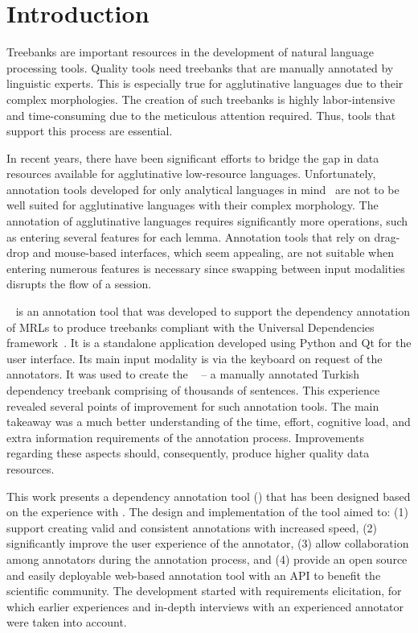 \section{Introduction}
\label{sec:introduction}

Treebanks are important resources in the development of natural language processing tools.
Quality tools need treebanks that are manually annotated by linguistic experts.
This is especially true for agglutinative languages due to their complex morphologies.
The creation of such treebanks is highly labor-intensive and time-consuming due to the meticulous attention required.
Thus, tools that support this process are essential.

In recent years, there have been significant efforts to bridge the gap in data resources available for agglutinative low-resource languages.
Unfortunately, annotation tools developed for only analytical languages in mind~\cite{UD-tools} are not to be well suited for agglutinative languages with their complex morphology.
The annotation of agglutinative languages requires significantly more operations, such as entering several features for each lemma.
Annotation tools that rely on drag-drop and mouse-based interfaces, which seem appealing, are not suitable when entering numerous features is necessary since swapping between input modalities disrupts the flow of a session.

\boatvone~\cite{turk2021resources} is an annotation tool that was developed to support the dependency annotation of MRLs to produce treebanks compliant with the Universal Dependencies framework~\cite{UD}.
It is a standalone application developed using Python and Qt for the user interface.
Its main input modality is via the keyboard on request of the annotators.
It was used to create the \bountreebank~\cite{turk-etal-2019-turkish,turk2021resources,UD-Boun-Treebank} -- a manually annotated Turkish dependency treebank comprising of thousands of sentences.
This experience revealed several points of improvement for such annotation tools.
The main takeaway was a much better understanding of the time, effort, cognitive load, and extra information requirements of the annotation process.
Improvements regarding these aspects should, consequently, produce higher quality data resources.

This work presents a dependency annotation tool (\boatvtwo) that has been designed based on the experience with \boatvone.
The design and implementation of the tool aimed to: (1) support creating valid and consistent annotations with increased speed, (2) significantly improve the user experience of the annotator, (3) allow collaboration among annotators during the annotation process, and (4) provide an open source and easily deployable web-based annotation tool with an API to benefit the scientific community.
The development started with requirements elicitation, for which earlier experiences and in-depth interviews with an experienced annotator were taken into account.

